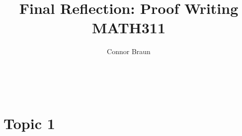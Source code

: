 \documentclass[11pt, letterpaper]{article}
\begin{document}
\title{Final Reflection: Proof Writing\\\normalsize MATH311}
\author{Connor Braun}

\allowdisplaybreaks

\maketitle\

\section*{Topic 1}
\begin{center}    
\end{center}
\begin{center}    
\end{center}
\end{document}

